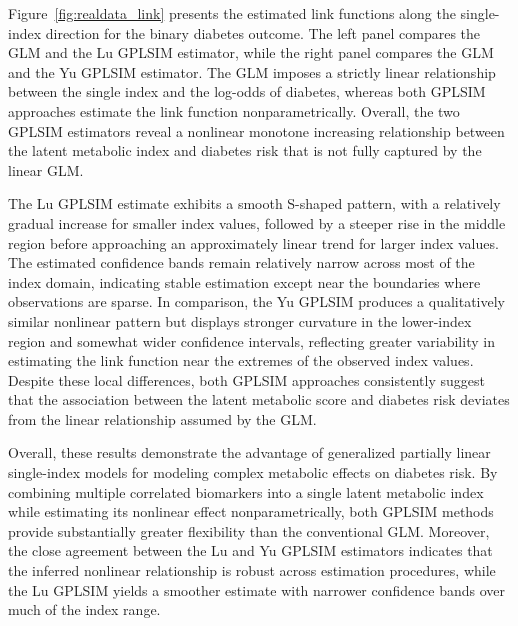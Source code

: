 
Figure~\ref{fig:realdata_link} presents the estimated link functions along the single-index direction for the binary diabetes outcome. The left panel compares the GLM and the Lu GPLSIM estimator, while the right panel compares the GLM and the Yu GPLSIM estimator. The GLM imposes a strictly linear relationship between the single index and the log-odds of diabetes, whereas both GPLSIM approaches estimate the link function nonparametrically. Overall, the two GPLSIM estimators reveal a nonlinear monotone increasing relationship between the latent metabolic index and diabetes risk that is not fully captured by the linear GLM.

The Lu GPLSIM estimate exhibits a smooth S-shaped pattern, with a relatively gradual increase for smaller index values, followed by a steeper rise in the middle region before approaching an approximately linear trend for larger index values. The estimated confidence bands remain relatively narrow across most of the index domain, indicating stable estimation except near the boundaries where observations are sparse. In comparison, the Yu GPLSIM produces a qualitatively similar nonlinear pattern but displays stronger curvature in the lower-index region and somewhat wider confidence intervals, reflecting greater variability in estimating the link function near the extremes of the observed index values. Despite these local differences, both GPLSIM approaches consistently suggest that the association between the latent metabolic score and diabetes risk deviates from the linear relationship assumed by the GLM.

Overall, these results demonstrate the advantage of generalized partially linear single-index models for modeling complex metabolic effects on diabetes risk. By combining multiple correlated biomarkers into a single latent metabolic index while estimating its nonlinear effect nonparametrically, both GPLSIM methods provide substantially greater flexibility than the conventional GLM. Moreover, the close agreement between the Lu and Yu GPLSIM estimators indicates that the inferred nonlinear relationship is robust across estimation procedures, while the Lu GPLSIM yields a smoother estimate with narrower confidence bands over much of the index range.



